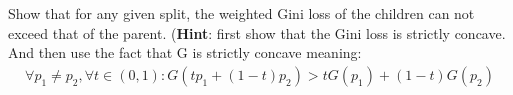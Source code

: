 \item {} Show that for any given split, the weighted Gini loss of the children can not exceed that of the parent. (\textbf{Hint}: first show that the Gini loss is strictly concave. And then use the fact that G is strictly concave meaning:
    \begin{align*}
        \forall p_1 \neq p_2, \forall t \in (0, 1): G(t p_1 + (1 - t) p_2) > t G(p_1) + (1 - t) G(p_2)
    \end{align*}